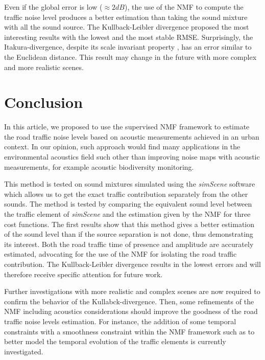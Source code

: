 \documentclass{article}
\begin{document}
\begin{sloppy}
Even if the global error is low ($\approx 2 dB$), the use of the NMF to compute the traffic noise level produces a better estimation than taking the sound mixture with all the sound source. The Kullback-Leibler divergence proposed the most interesting results with the lowest and the most stable RMSE. 
Surprisingly, the Itakura-divergence, despite its scale invariant property \cite{fevotte2011}, has an error similar to the Euclidean distance. This result may change in the future with more complex and more realistic scenes.


\section{Conclusion}

In this article, we proposed to use the supervised NMF framework to estimate the road traffic noise levels based on acoustic measurements achieved in an urban context. In our opinion, such approach would find many applications in the environmental acoustics field such other than improving noise maps with acoustic measurements, for example acoustic biodiversity monitoring. 

This method is tested on sound mixtures simulated using the \textit{simScene} software which allows us to get the exact traffic contribution separately from the other sounds. The method is tested by comparing the equivalent sound level between the traffic element of \textit{simScene} and the estimation given by the NMF for three cost functions. The first results show that this method gives a better estimation of the sound level than if the source separation is not done, thus demonstrating its interest. Both the road traffic time of presence and amplitude are accurately estimated, advocating for the use of the NMF for isolating the road traffic contribution. The Kullback-Leibler divergence results in the lowest errors and will therefore receive specific attention for future work. 

Further investigations with more realistic and complex scenes are now required to confirm the behavior of the Kullabck-divergence. Then, some refinements of the NMF including acoustics considerations should improve the goodness of the road traffic noise levels estimation. For instance, the addition of some temporal constraints with a smoothness constraint within the NMF framework such as \cite{fevotteSmooth} \cite{Essid} \cite{virtanenSmooth} to better model the temporal evolution of the traffic elements is currently investigated.


\end{sloppy}
\end{document}
